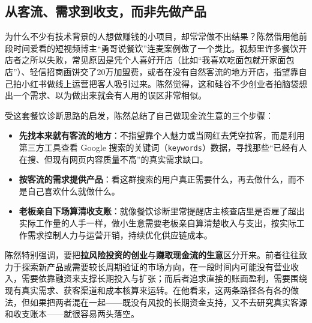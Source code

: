 \documentclass[UTF8,a4paper,11pt,fontset=fandol]{ctexart}
\begin{document}
\subsection{从客流、需求到收支，而非先做产品}
为什么不少有技术背景的人想做赚钱的小项目，却常常做不出结果？陈然借用他前段时间爱看的短视频博主“勇哥说餐饮”连麦案例做了一个类比。视频里许多餐饮开店者之所以失败，常见原因是凭个人喜好开店（比如“我喜欢吃面包就开家面包店”）、轻信招商画饼交了20万加盟费，或者在没有自然客流的地方开店，指望靠自己拍小红书做线上运营把客人吸引过来。陈然觉得，这和硅谷不少创业者拍脑袋想出一个需求、以为做出来就会有人用的误区非常相似。

受这套餐饮诊断思路的启发，陈然总结了自己做现金流生意的三个步骤：
\begin{itemize}
\item \textbf{先找本来就有客流的地方}：不指望靠个人魅力或当网红去凭空拉客，而是利用第三方工具查看 Google 搜索的关键词（\texttt{keywords}）数据，寻找那些“已经有人在搜、但现有网页内容质量不高”的真实需求缺口。
\item \textbf{按客流的需求提供产品}：看这群搜索的用户真正需要什么，再去做什么，而不是自己喜欢什么就做什么。
\item \textbf{老板亲自下场算清收支账}：就像餐饮诊断里常提醒店主核查店里是否雇了超出实际工作量的人手一样，做小生意需要老板亲自算清楚收入与支出，按实际工作需求控制人力与运营开销，持续优化供应链成本。
\end{itemize}

陈然特别强调，要把\textbf{拉风险投资的创业}与\textbf{赚取现金流的生意}区分开来。前者往往致力于探索新产品或需要较长周期验证的市场方向，在一段时间内可能没有营业收入，需要依靠融资来支撑长期投入与扩张；而后者追求直接的账面盈利，需要围绕现有真实需求、获客渠道和成本核算来运转。在他看来，这两条路径各有各的做法，但如果把两者混在一起——既没有风投的长期资金支持，又不去研究真实客源和收支账本——就很容易两头落空。
\end{document}
